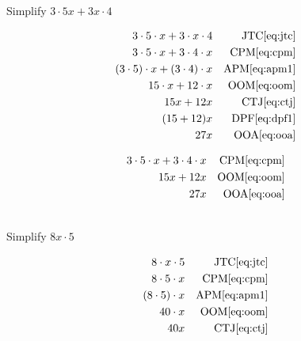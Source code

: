 \documentclass[20150903-160354-rs2.2-MarksMathNotebook.tex]{subfiles}
\begin{document}
\begin{example}[id:20141108-194156] \label{20141108-194156}  \hfill \\

Simplify $3 \cdot 5x + 3x \cdot 4$

\soln

\solnsteps
\begin{align*}
3 \cdot 5 \cdot x + 3 \cdot x \cdot 4 && \text{JTC} \eqref{eq:jtc} \\
3 \cdot 5 \cdot x + 3 \cdot 4 \cdot x && \text{CPM} \eqref{eq:cpm} \\
(3 \cdot 5) \cdot x + (3 \cdot 4) \cdot x && \text{APM} \eqref{eq:apm1} \\
15 \cdot x + 12 \cdot x && \text{OOM} \eqref{eq:oom} \\
15x +12x && \text{CTJ} \eqref{eq:ctj} \\
(15+12)x && \text{DPF} \eqref{eq:dpf1} \\
27x && \text{OOA} \eqref{eq:ooa}
\end{align*}

\soln

\lesssteps
\begin{align*}
3 \cdot 5 \cdot x + 3 \cdot 4 \cdot x && \text{CPM} \eqref{eq:cpm} \\
15x + 12x && \text{OOM} \eqref{eq:oom} \\
27x && \text{OOA} \eqref{eq:ooa}
\end{align*}

\end{example}

\begin{example}[id:20141108-173613] \label{20141108-173613}  \hfill \\

Simplify $8x \cdot 5$

\soln

\solnsteps
\begin{align*}
8 \cdot x \cdot 5 && \text{JTC} \eqref{eq:jtc} \\
8 \cdot 5 \cdot x && \text{CPM} \eqref{eq:cpm} \\
(8 \cdot 5) \cdot x && \text{APM} \eqref{eq:apm1} \\
40 \cdot x && \text{OOM} \eqref{eq:oom} \\
40x && \text{CTJ} \eqref{eq:ctj}
\end{align*}
\end{example}
\end{document}

